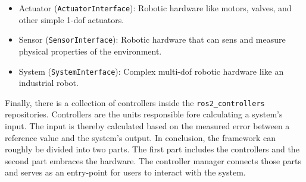 \begin{itemize}
    \item Actuator (\texttt{ActuatorInterface}): Robotic hardware like motors, valves, and other simple 1-\gls{dof} actuators.
    \item Sensor (\texttt{SensorInterface}): Robotic hardware that can sens and measure physical properties of the environment.
    \item System (\texttt{SystemInterface}): Complex multi-\gls{dof} robotic hardware like an industrial robot.
\end{itemize}
 Finally, there is a collection of controllers inside the \texttt{ros2\_controllers} repositories. Controllers are the units responsible fore calculating a system's input. The input is thereby calculated based on the measured error between a reference value and the system's output.\newline
 In conclusion, the framework can roughly be divided into two parts. The first part includes the controllers and the second part embraces the hardware. The controller manager connects those parts and serves as an entry-point for users to interact with the system.

